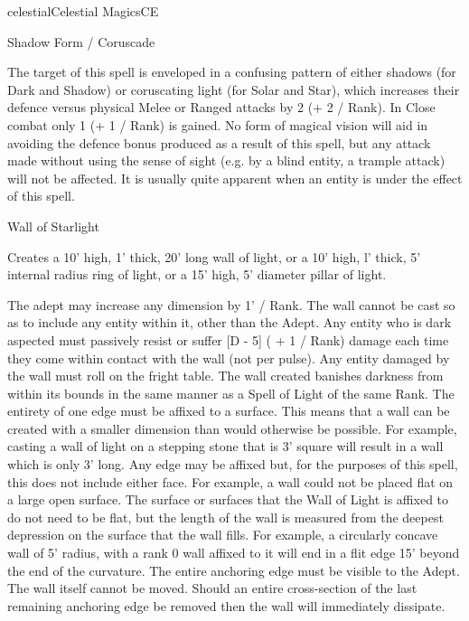 \begin{College}[1.3]{celestial}{Celestial Magics}{CE}
\begin{spell}[G-4]{Shadow Form / Coruscade}

\begin{effects}
The target of this spell is enveloped in a confusing pattern of either
shadows (for Dark and Shadow) or coruscating light (for Solar and
Star), which increases their defence versus physical Melee or Ranged
attacks by 2 (+ 2 / Rank).  In Close combat only 1 (+ 1 / Rank) is
gained.  No form of magical vision will aid in avoiding the defence
bonus produced as a result of this spell, but any attack made without
using the sense of sight (e.g. by a blind entity, a trample attack)
will not be affected. It is usually quite apparent when an entity is
under the effect of this spell.
\end{effects}
\end{spell}


\begin{spell}[G-5]{Wall of Starlight}

\begin{effects}
Creates a 10’ high, 1’ thick, 20’ long wall of light, or a 10’ high,
l’ thick, 5’ internal radius ring of light, or a 15’ high, 5’ diameter
pillar of light.

The adept may increase any dimension by 1’ / Rank. The wall cannot be
cast so as to include any entity within it, other than the Adept.  Any
entity who is dark aspected must passively resist or suffer [D - 5] (
+ 1 / Rank) damage each time they come within contact with the wall
(not per pulse).  Any entity damaged by the wall must roll on the
fright table.  The wall created banishes darkness from within its
bounds in the same manner as a Spell of Light of the same Rank.  The
entirety of one edge must be affixed to a surface. This means that a
wall can be created with a smaller dimension than would otherwise be
possible. For example, casting a wall of light on a stepping stone
that is 3’ square will result in a wall which is only 3’ long.  Any
edge may be affixed but, for the purposes of this spell, this does not
include either face.  For example, a wall could not be placed flat
on a large open surface.  The surface or surfaces that the Wall of
Light is affixed to do not need to be flat, but the length of the wall
is measured from the deepest depression on the surface that the wall
fills.  For example, a circularly concave wall of 5’ radius, with a
rank 0 wall affixed to it will end in a flit edge 15’ beyond the end
of the curvature.  The entire anchoring edge must be visible to the
Adept.  The wall itself cannot be moved.  Should an entire
cross-section of the last remaining anchoring edge be removed then the
wall will immediately dissipate.


\end{effects}
\end{spell}
\end{College}
